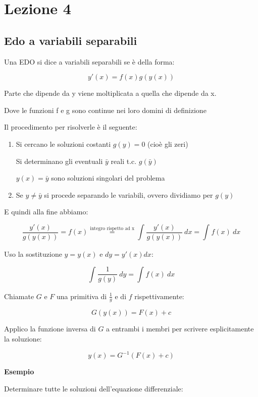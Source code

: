 \documentclass[../appunti-analisi.tex]{subfiles}
\begin{document}
\section{Lezione 4}

\subsection{Edo a variabili separabili}

Una EDO si dice a variabili separabili se è della forma:

\[
    y'(x) = f(x) g(y(x))
\]

Parte che dipende da y viene moltiplicata a quella che dipende da x.

Dove le funzioni f e g sono continue nei loro domini di definizione

Il procedimento per risolverle è il seguente:

\begin{enumerate}
    \item Si cercano le soluzioni costanti $g(y)=0$ (cioè gli zeri)

        Si determinano gli eventuali $\bar y$ reali t.c. $g(\bar y)$

        $y(x)= \bar y$ sono soluzioni singolari del problema 
        
    \item Se $y \neq \bar y$ si procede separando le variabili, ovvero dividiamo per $g(y)$
\end{enumerate}

E quindi alla fine abbiamo:

\[
    \frac{y'(x)}{g(y(x))} = f(x) \overset{\text{integro rispetto ad x}}{=} \int_{{}}^{{}} {\frac{y'(x)}{g(y(x))} } \: d{x} {} = \int_{{}}^{{}} {f(x)} \: d{x} {}
\]

Uso la sostituzione $y = y(x)$ e $dy = y'(x) dx$:

\[
    \int_{{}}^{{}} {\frac{1}{g(y)} } \: d{y} = {\int_{{}}^{{}} {f(x)} \: d{x} {}}
\]

Chiamate $G$ e $F$ una primitiva di $\frac{1}{g} $ e di $f$ rispettivamente:

\[
    G(y(x)) = F(x) + c
\]

Applico la funzione inversa di $G$ a entrambi i membri per scrivere esplicitamente la soluzione:

\[
    y(x) = G ^{-1} (F(x) + c)
\]

\textbf{Esempio}

Determinare tutte le soluzioni dell'equazione differenziale:
\end{document}
